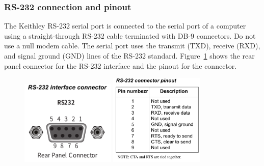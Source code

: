 \subsubsection{RS-232 connection and pinout}
The Keithley RS-232 serial port is connected to the serial port of a computer
using a straight-through RS-232 cable terminated with DB-9 connectors. Do not
use a null modem cable. The serial port uses the transmit (TXD), receive (RXD),
and signal ground (GND) lines of the RS-232
standard. Figure~\ref{RS232-pinout-instrument} shows the rear panel connector
for the RS-232 interface and the pinout for the connector.
\begin{figure}[H]
  \centering \includegraphics[width=0.4\textwidth]{RS232-pinout-connector}\hfill
  \centering \includegraphics[width=0.4\textwidth]{RS232-pinout-instrument}
  \caption{}\label{RS232-pinout-instrument}
\end{figure}

